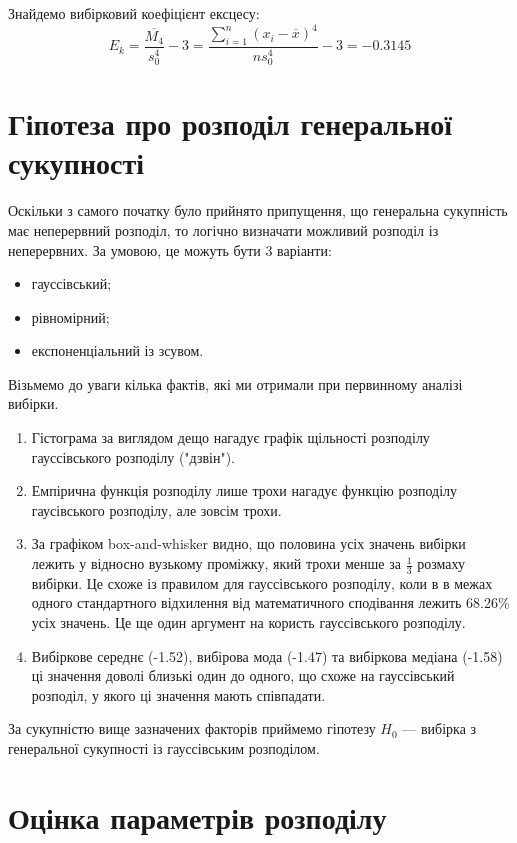 \documentclass[14pt, a4paper, ukrainian]{extreport}
\begin{document}
	Знайдемо вибірковий коефіцієнт ексцесу:
	$$ E_k = \frac{\overline{M_4}}{s_0^4} - 3= \frac{\sum_{i=1}^{n}(x_i - \overline{x})^4}{ns_0^4} - 3 = -0.3145$$
		
	\chapter{Гіпотеза про розподіл генеральної сукупності}
	
	Оскільки з самого початку було прийнято припущення, що генеральна сукупність має неперервний розподіл, то логічно визначати можливий розподіл із неперервних. За умовою, це можуть бути 3 варіанти:
	\begin{itemize}
		\item гауссівський;
		\item рівномірний;
		\item експоненціальний із зсувом.
	\end{itemize}

	Візьмемо до уваги кілька фактів, які ми отримали при первинному аналізі вибірки.
	\begin{enumerate}
		\item Гістограма за виглядом дещо нагадує графік щільності розподілу гауссівського розподілу ("дзвін").
		\item Емпірична функція розподілу лише трохи нагадує функцію розподілу гаусівського розподілу, але зовсім трохи.
		\item За графіком box-and-whisker видно, що половина усіх значень вибірки лежить у відносно вузькому проміжку, який трохи менше за $\frac{1}{3}$ розмаху вибірки. Це схоже із правилом для гауссівського розподілу, коли в в межах одного стандартного відхилення від математичного сподівання лежить 68.26\% усіх значень. Це ще один аргумент на користь гауссівського розподілу.
		\item Вибіркове середнє (-1.52), вибірова мода (-1.47) та вибіркова медіана (-1.58) ці значення доволі близькі один до одного, що схоже на гауссівський розподіл, у якого ці значення мають співпадати.
	\end{enumerate}
	
	За сукупністю вище зазначених факторів приймемо гіпотезу $H_0$ --- вибірка з генеральної сукупності із гауссівським розподілом.
	
	\chapter{Оцінка параметрів розподілу}
	
\end{document}
